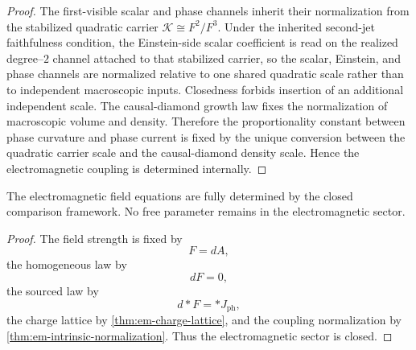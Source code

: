 \begin{proof}
	The first-visible scalar and phase channels inherit their
	normalization from the stabilized quadratic carrier
	\(\mathcal K\cong F^2/F^3\).
	Under the inherited second-jet faithfulness condition, the
	Einstein-side scalar coefficient is read on the realized
	degree--\(2\) channel attached to that stabilized carrier, so the
	scalar, Einstein, and phase channels are normalized relative to one
	shared quadratic scale rather than to independent macroscopic
	inputs.
	Closedness forbids insertion of an additional independent scale.
	The causal-diamond growth law fixes the normalization of macroscopic
	volume and density.
	Therefore the proportionality constant between phase curvature and phase
	current is fixed by the unique conversion between the quadratic carrier
	scale and the causal-diamond density scale.
	Hence the electromagnetic coupling is determined internally.
\end{proof}
\begin{corollary}
	The electromagnetic field equations are fully determined by the closed
	comparison framework.
	No free parameter remains in the electromagnetic sector.
\end{corollary}
\begin{proof}
	The field strength is fixed by
	\[
		F=dA,
	\]
	the homogeneous law by
	\[
		dF=0,
	\]
	the sourced law by
	\[
		d{*}F={*}J_{\mathrm{ph}},
	\]
	the charge lattice by \cref{thm:em-charge-lattice}, and the coupling
	normalization by \cref{thm:em-intrinsic-normalization}.
	Thus the electromagnetic sector is closed.
\end{proof}
